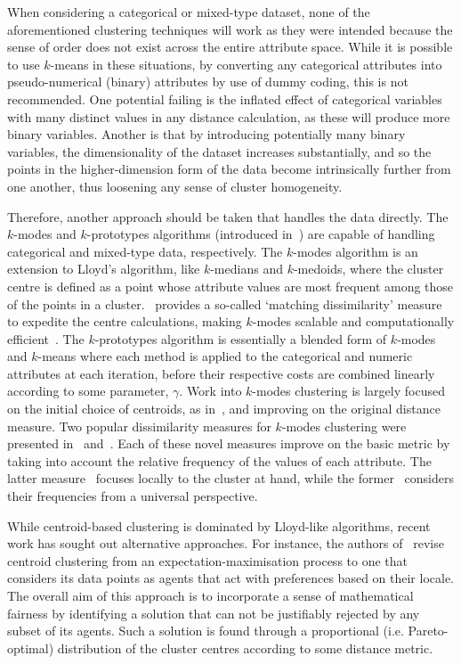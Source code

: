 When considering a categorical or mixed-type dataset, none of the aforementioned
clustering techniques will work as they were intended because the sense of order
does not exist across the entire attribute space. While it is possible to use
\(k\)-means in these situations, by converting any categorical attributes into
pseudo-numerical (binary) attributes by use of dummy coding, this is not
recommended. One potential failing is the inflated effect of categorical
variables with many distinct values in any distance calculation, as these will
produce more binary variables. Another is that by introducing potentially many
binary variables, the dimensionality of the dataset increases substantially, and
so the points in the higher-dimension form of the data become intrinsically
further from one another, thus loosening any sense of cluster homogeneity.

Therefore, another approach should be taken that handles the data directly. The
\(k\)-modes and \(k\)-prototypes algorithms (introduced in~\cite{Huang1998}) are
capable of handling categorical and mixed-type data, respectively. The
\(k\)-modes algorithm is an extension to Lloyd's algorithm, like \(k\)-medians
and \(k\)-medoids, where the cluster centre is defined as a point whose
attribute values are most frequent among those of the points in a
cluster.~\cite{Huang1998} provides a so-called `matching dissimilarity' measure
to expedite the centre calculations, making \(k\)-modes scalable and
computationally efficient~\cite{Madhuri2014}. The \(k\)-prototypes algorithm is
essentially a blended form of \(k\)-modes and \(k\)-means where each method is
applied to the categorical and numeric attributes at each iteration, before
their respective costs are combined linearly according to some parameter,
\(\gamma\). Work into \(k\)-modes clustering is largely focused on the initial
choice of centroids, as
in~\cite{Cao2009,Jiang2016,Khan2013,Khan2007,Taoying2013,Wilde2020:kmodes}, and
improving on the original distance measure. Two popular dissimilarity measures
for \(k\)-modes clustering were presented in~\cite{Cao2012} and~\cite{Ng2007}.
Each of these novel measures improve on the basic metric by taking into account
the relative frequency of the values of each attribute. The latter
measure~\cite{Ng2007} focuses locally to the cluster at hand, while the
former~\cite{Cao2012} considers their frequencies from a universal perspective.

While centroid-based clustering is dominated by Lloyd-like algorithms, recent
work has sought out alternative approaches. For instance, the authors
of~\cite{Chen2019} revise centroid clustering from an expectation-maximisation
process to one that considers its data points as agents that act with
preferences based on their locale. The overall aim of this approach is to
incorporate a sense of mathematical fairness by identifying a solution that can
not be justifiably rejected by any subset of its agents. Such a solution is
found through a proportional (i.e. Pareto-optimal) distribution of the cluster
centres according to some distance metric.


